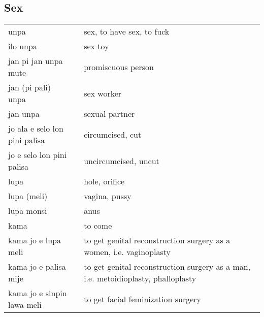 \subsection{Sex}
%
\begin{supertabular}{p{4,5cm}|ll}
    unpa                               &  & sex, to have sex, to fuck                                                         \\
    ilo unpa                           &  & sex toy                                                                           \\
    jan pi jan unpa mute               &  & promiscuous person                                                                \\
    jan (pi pali) unpa                 &  & sex worker                                                                        \\
    jan unpa                           &  & sexual partner                                                                    \\
    jo ala e selo lon pini palisa      &  & circumcised, cut                                                                  \\
    jo e selo lon pini palisa          &  & uncircumcised, uncut                                                              \\
    lupa                               &  & hole, orifice                                                                     \\
    lupa (meli)                        &  & vagina, pussy                                                                     \\
    lupa monsi                         &  & anus                                                                              \\
    kama                               &  & to come                                                                           \\
    kama jo e lupa meli                &  & to get genital reconstruction surgery as a women, i.e. vaginoplasty               \\
    kama jo e palisa mije              &  & to get genital reconstruction surgery as a man, i.e. metoidioplasty, phalloplasty \\
    kama jo e sinpin lawa meli         &  & to get facial feminization surgery                                                \\

\end{supertabular}
